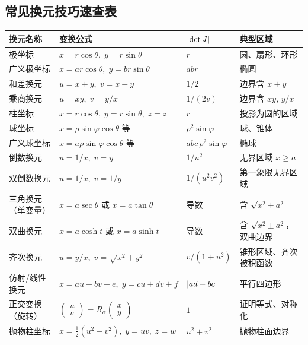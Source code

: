 \documentclass{ctexart}
\begin{document}
\subsection{常见换元技巧速查表}

\begin{center}
\renewcommand{\arraystretch}{1.6}
\begin{tabular}{>{\raggedright\arraybackslash}p{3.5cm}
                >{\raggedright\arraybackslash}p{4cm}
                >{\centering\arraybackslash}p{3.2cm}
                >{\raggedright\arraybackslash}p{3cm}}
  \toprule
  \textbf{换元名称} & \textbf{变换公式} & $\left| \det J \right|$ & \textbf{典型区域} \\
  \midrule
  极坐标
    & $x = r\cos\theta,\; y = r\sin\theta$
    & $r$
    & 圆、扇形、环形 \\
  广义极坐标
    & $x = ar\cos\theta,\; y = br\sin\theta$
    & $abr$
    & 椭圆 \\
  和差换元
    & $u = x+y,\; v = x-y$
    & $1/2$
    & 边界含 $x \pm y$ \\
  乘商换元
    & $u = xy,\; v = y/x$
    & $1/(2v)$
    & 边界含 $xy$, $y/x$ \\
  柱坐标
    & $x = r\cos\theta,\; y = r\sin\theta,\; z = z$
    & $r$
    & 投影为圆的区域 \\
  球坐标
    & $x = \rho\sin\varphi\cos\theta$ 等
    & $\rho^2\sin\varphi$
    & 球、锥体 \\
  广义球坐标
    & $x = a\rho\sin\varphi\cos\theta$ 等
    & $abc\,\rho^2\sin\varphi$
    & 椭球 \\
  倒数换元
    & $u = 1/x,\; v = y$
    & $1/u^2$
    & 无界区域 $x \ge a$ \\
  双倒数换元
    & $u = 1/x,\; v = 1/y$
    & $1/(u^2v^2)$
    & 第一象限无界区域 \\
  三角换元（单变量）
    & $x = a\sec\theta$ 或 $x = a\tan\theta$
    & 导数
    & 含 $\sqrt{x^2 \pm a^2}$ \\
  双曲换元
    & $x = a\cosh t$ 或 $x = a\sinh t$
    & 导数
    & 含 $\sqrt{x^2 \pm a^2}$，双曲边界 \\
  齐次换元
    & $u = y/x,\; v = \sqrt{x^2+y^2}$
    & $v/(1+u^2)$
    & 锥形区域、齐次被积函数 \\
  仿射/线性换元
    & $x = au+bv+e,\; y = cu+dv+f$
    & $\left| ad-bc \right|$
    & 平行四边形 \\
  正交变换（旋转）
    & $\left(\begin{smallmatrix} u\\v \end{smallmatrix}\right) = R_\alpha \left(\begin{smallmatrix} x\\y \end{smallmatrix}\right)$
    & $1$
    & 证明等式、对称化 \\
  抛物柱坐标
    & $x = \frac{1}{2}(u^2-v^2),\; y = uv,\; z = w$
    & $u^2+v^2$
    & 抛物柱面边界 \\
  \bottomrule
\end{tabular}
\end{center}
\end{document}
